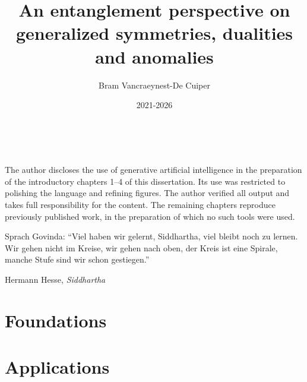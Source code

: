 \documentclass[print]{dissertation}
\author{Bram Vancraeynest-De Cuiper}
\title{An entanglement perspective on generalized symmetries, dualities and anomalies}
\date{2021-2026}
\begin{document}


\frontmatter


\newpage\thispagestyle{empty}\ \newpage




\cleardoublepage
\thispagestyle{plain}
{\null\vfill\scriptsize The author discloses the use of generative artificial intelligence in the preparation of the introductory chapters 1–4 of this dissertation. Its use was restricted to polishing the language and refining figures. The author verified all output and takes full responsibility for the content. The remaining chapters reproduce previously published work, in the preparation of which no such tools were used.}

\setcounter{tocdepth}{2} %
\tableofcontents

\cleardoublepage
\thispagestyle{plain}
\epigraph{Sprach Govinda: ``Viel haben wir gelernt, Siddhartha, viel bleibt noch zu lernen. Wir gehen nicht im Kreise, wir gehen nach oben, der Kreis ist eine Spirale, manche Stufe sind wir schon gestiegen.''}{Hermann Hesse, \emph{Siddhartha}}



\mainmatter

\thumbtrue



\thumbfalse
\part{Foundations}\label{part:Foundations}
\thumbtrue





\part{Applications}\label{part:Applications}












\end{document}
